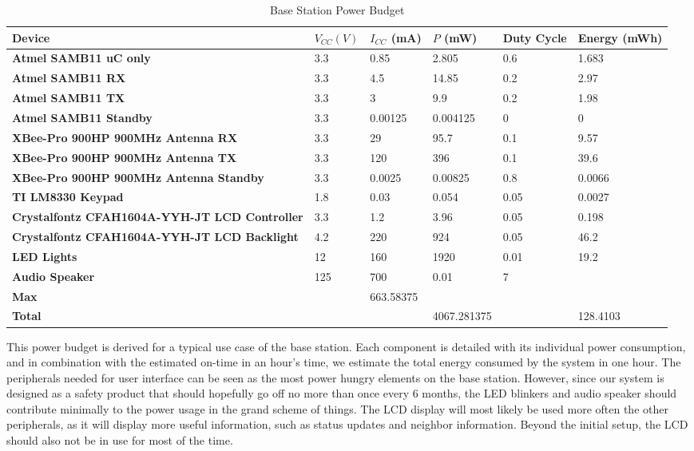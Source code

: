 \documentclass[journal]{IEEEtran}
\begin{document}
\begin{table*}[t]
  \centering
  \begin{tabular}{>{\bfseries}l|l l l l l}
    Device & $V_{CC} (V)$ & $I_{CC}$ (mA) & $P$ (mW) & Duty Cycle & Energy (mWh) \\
    \hline
    Atmel SAMB11 uC only & 3.3 & 0.85 & 2.805 & 0.6 & 1.683 \\
    Atmel SAMB11 RX & 3.3 & 4.5 & 14.85 & 0.2 & 2.97 \\
    Atmel SAMB11 TX & 3.3 & 3 & 9.9 & 0.2 & 1.98 \\
    Atmel SAMB11 Standby & 3.3 & 0.00125 & 0.004125 & 0 & 0 \\
    XBee-Pro 900HP 900MHz Antenna RX & 3.3 & 29 & 95.7 & 0.1 & 9.57 \\
    XBee-Pro 900HP 900MHz Antenna TX & 3.3 & 120 & 396 & 0.1 & 39.6 \\
    XBee-Pro 900HP 900MHz Antenna Standby & 3.3 & 0.0025 & 0.00825 & 0.8 & 0.0066 \\
    TI LM8330 Keypad & 1.8 & 0.03 & 0.054 & 0.05 & 0.0027 \\
    Crystalfontz CFAH1604A-YYH-JT LCD Controller & 3.3 & 1.2 & 3.96 & 0.05 & 0.198 \\
    Crystalfontz CFAH1604A-YYH-JT LCD Backlight & 4.2 & 220 & 924 & 0.05 & 46.2 \\
    LED Lights & 12 & 160 & 1920 & 0.01 & 19.2 \\
    Audio Speaker & 125 & 700 & 0.01 & 7 \\
    \hline
    Max & & 663.58375 & & & \\
    Total & & & 4067.281375 & & 128.4103
  \end{tabular}
  \caption{Base Station Power Budget}
\end{table*}

This power budget is derived for a typical use case of the base station.  Each component is detailed with its individual power consumption, and in combination with the estimated on-time in an hour’s time, we estimate the total energy consumed by the system in one hour.  The peripherals needed for user interface can be seen as the most power hungry elements on the base station.  However, since our system is designed as a safety product that should hopefully go off no more than once every 6 months, the LED blinkers and audio speaker should contribute minimally to the power usage in the grand scheme of things.  The LCD display will most likely be used more often the other peripherals, as it will display more useful information, such as status updates and neighbor information.  Beyond the initial setup, the LCD should also not be in use for most of the time.
\end{document}
